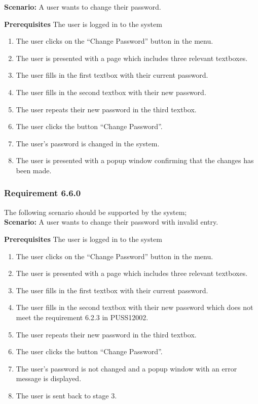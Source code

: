 \documentclass{article}
\begin{document}
\textbf{Scenario:} A user wants to change their password.

\textbf{Prerequisites} The user is logged in to the system

\begin{enumerate}
    \item The user clicks on the “Change Password” button in the menu.
    \item The user is presented with a page which includes three relevant textboxes.
    \item The user fills in the first textbox with their current password.
    \item The user fills in the second textbox with their new password.
    \item The user repeats their new password in the third textbox.
    \item The user clicks the button “Change Password”.
    \item The user's password is changed in the system.
    \item The user is presented with a popup window confirming that the changes has been made.
\end{enumerate}

\subsubsection{Requirement 6.6.0}
The following scenario should be supported by the system;\\

\textbf{Scenario:} A user wants to change their password with invalid entry.

\textbf{Prerequisites} The user is logged in to the system

\begin{enumerate}
    \item The user clicks on the “Change Password” button in the menu.
    \item The user is presented with a page which includes three relevant textboxes.
    \item The user fills in the first textbox with their current password.
    \item The user fills in the second textbox with their new password which does not meet the requirement 6.2.3 in PUSS12002.
    \item The user repeats their new password in the third textbox.
    \item The user clicks the button “Change Password”.
    \item The user's password is not changed and a popup window with an error message is displayed.
    \item The user is sent back to stage 3.
\end{enumerate}
\end{document}
